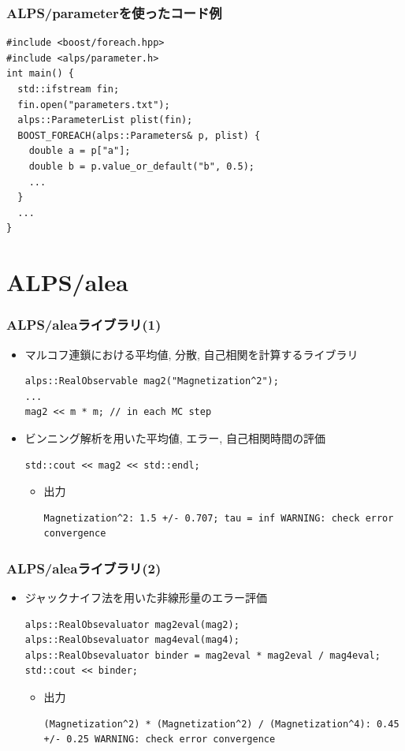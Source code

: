 \begin{frame}[t,fragile]
  \frametitle{ALPS/parameterを使ったコード例}
  \begin{lstlisting}
#include <boost/foreach.hpp>
#include <alps/parameter.h>
int main() {
  std::ifstream fin;
  fin.open("parameters.txt");
  alps::ParameterList plist(fin);
  BOOST_FOREACH(alps::Parameters& p, plist) {
    double a = p["a"];
    double b = p.value_or_default("b", 0.5);
    ...
  }
  ...
}
\end{lstlisting}
\end{frame}

\section{ALPS/alea}
\begin{frame}[t,fragile]
  \frametitle{ALPS/aleaライブラリ(1)}
  \begin{itemize}
  \item マルコフ連鎖における平均値, 分散, 自己相関を計算するライブラリ
    \begin{lstlisting}
alps::RealObservable mag2("Magnetization^2");
...
mag2 << m * m; // in each MC step
\end{lstlisting}
  \item ビンニング解析を用いた平均値, エラー, 自己相関時間の評価
    \begin{lstlisting}
std::cout << mag2 << std::endl;
\end{lstlisting}
  \begin{itemize}
  \item 出力
\begin{lstlisting}
Magnetization^2: 1.5 +/- 0.707; tau = inf WARNING: check error convergence
\end{lstlisting}
  \end{itemize}
  \end{itemize}
\end{frame}

\begin{frame}[t,fragile]
  \frametitle{ALPS/aleaライブラリ(2)}
  \begin{itemize}
  \item ジャックナイフ法を用いた非線形量のエラー評価
    \begin{lstlisting}
alps::RealObsevaluator mag2eval(mag2);
alps::RealObsevaluator mag4eval(mag4);
alps::RealObsevaluator binder = mag2eval * mag2eval / mag4eval;
std::cout << binder;
\end{lstlisting}
  \begin{itemize}
  \item 出力
\begin{lstlisting}
(Magnetization^2) * (Magnetization^2) / (Magnetization^4): 0.45 +/- 0.25 WARNING: check error convergence
\end{lstlisting}
  \end{itemize}
  \end{itemize}
\end{frame}

